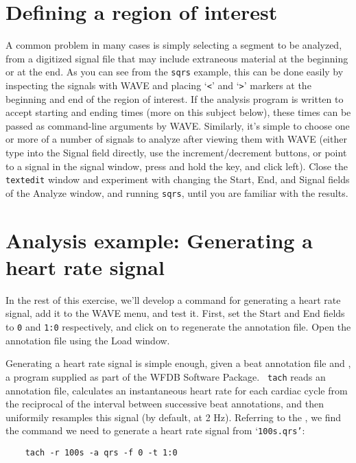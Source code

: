 \documentclass[twoside]{book}
\newcommand{\keycap}[1]{\cornersize{.5}\Ovalbox{\small\sf #1}}
\newcommand{\button}[1]{\cornersize{2}\ovalbox{\rule[-.3mm]{0cm}{2.5mm}\small\sf ~#1~}}
\newcommand{\WAVE}{{\sf WAVE}\xspace}
\begin{document}
\section{Defining a region of interest}

A common problem in many cases is simply selecting a segment to be analyzed,
from a digitized signal file that may include extraneous material at the
beginning or at the end.  As you can see from the {\tt sqrs} example, this can
be done easily by inspecting the signals with \WAVE{} and placing `{\tt <}'
and `{\tt >}' markers at the beginning and end of the region of interest.  If
the analysis program is written to accept starting and ending times (more on
this subject below), these times can be passed as command-line arguments by
\WAVE{}.  Similarly, it's simple to choose one or more of a number of
signals to analyze after viewing them with \WAVE{} (either type into the
{\sf Signal} field directly, use the increment/decrement buttons, or point to
a signal in the signal window, press and hold the \keycap{Shift} key, and click
left).  Close the {\tt textedit} window and experiment with changing the {\sf
Start}, {\sf End}, and {\sf Signal} fields of the {\sf Analyze} window, and
running {\tt sqrs}, until you are familiar with the results.

\label{sec:analysis-example}
\section{Analysis example: Generating a heart rate signal}
In the rest of this exercise, we'll develop a command for generating a heart
rate signal, add it to the \WAVE{} menu, and test it.  First, set the {\sf
Start} and {\sf End} fields to {\tt 0} and {\tt 1:0} respectively, and click on
\button{Mark QRS complexes} to regenerate the annotation file.  Open
the annotation file using the {\sf Load} window.

Generating a heart rate signal is simple enough, given a beat annotation file
and 
,
a program supplied as part of the WFDB Software Package.  {\tt
tach} reads an annotation file, calculates an instantaneous heart rate for each
cardiac cycle from the reciprocal of the interval between successive beat
annotations, and then uniformily resamples this signal (by default, at 2 Hz).
Referring to the 
,
we find the command we need to generate a heart rate signal from
`{\tt 100s.qrs'}:
\begin{verbatim}
    tach -r 100s -a qrs -f 0 -t 1:0
\end{verbatim}
\end{document}
